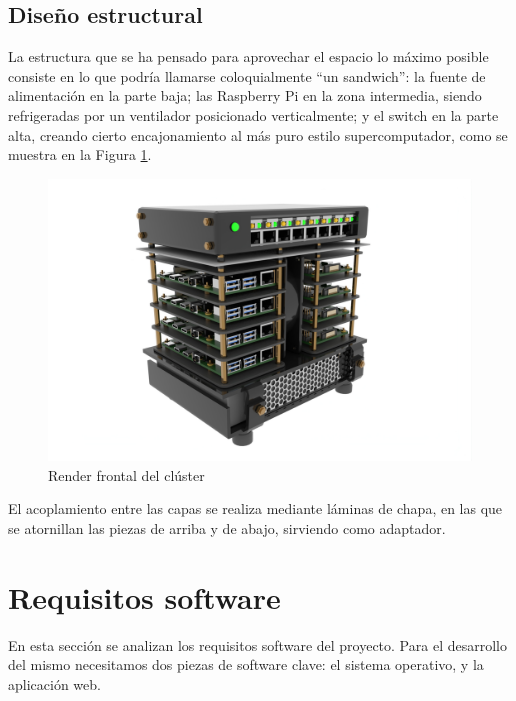 

\subsection{Diseño estructural}
\label{ssec:diseño_estructural}
La estructura que se ha pensado para aprovechar el espacio lo máximo posible consiste en lo que podría llamarse coloquialmente ``un sandwich'': la fuente de alimentación en la parte baja; las Raspberry Pi en la zona intermedia, siendo refrigeradas por un ventilador posicionado verticalmente; y el switch en la parte alta, creando cierto encajonamiento al más puro estilo supercomputador, como se muestra en la Figura \ref{fig:render_cluster_1}.

\begin{figure}[h!]
  \centering
  \includegraphics[width=\textwidth]{img/cluster_render_front.jpg}
  \caption{Render frontal del clúster}
  \label{fig:render_cluster_1}
\end{figure}

El acoplamiento entre las capas se realiza mediante láminas de chapa, en las que se atornillan las piezas de arriba y de abajo, sirviendo como adaptador.


\section{Requisitos software}
\label{sec:requisitos_software}
En esta sección se analizan los requisitos software del proyecto. Para el desarrollo del mismo necesitamos dos piezas de software clave: el sistema operativo, y la aplicación web.

